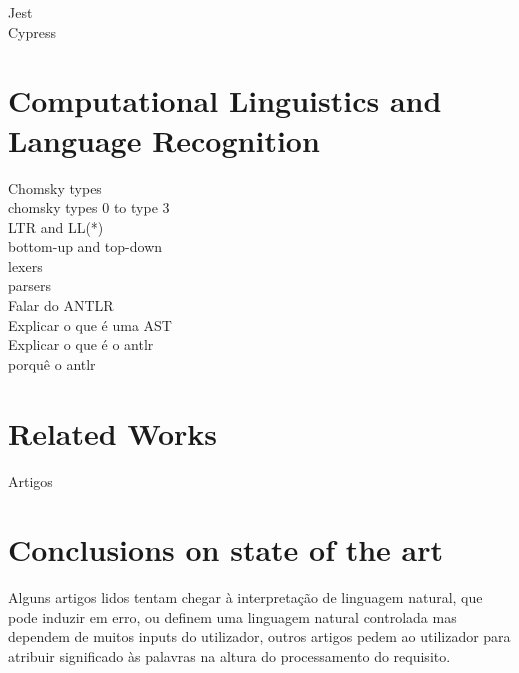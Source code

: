 Jest\\
Cypress\\


\label{sec:computational_linguistics}
\section{Computational Linguistics and Language Recognition}


Chomsky types\\
chomsky types 0 to type 3\\
LTR and LL(*)\\
bottom-up and top-down\\
lexers\\
parsers\\
Falar do ANTLR\\
Explicar o que é uma AST\\
Explicar o que é o antlr\\
porquê o antlr\\



\section{Related Works}
\label{sec:related_works}

Artigos\\


\section{Conclusions on state of the art}
\label{sec:sota_conclusions}

Alguns artigos lidos tentam chegar à interpretação de linguagem natural, que pode induzir em erro, ou definem uma linguagem natural controlada mas dependem de muitos inputs do utilizador, outros artigos pedem ao utilizador para atribuir significado às palavras na altura do processamento do requisito.

